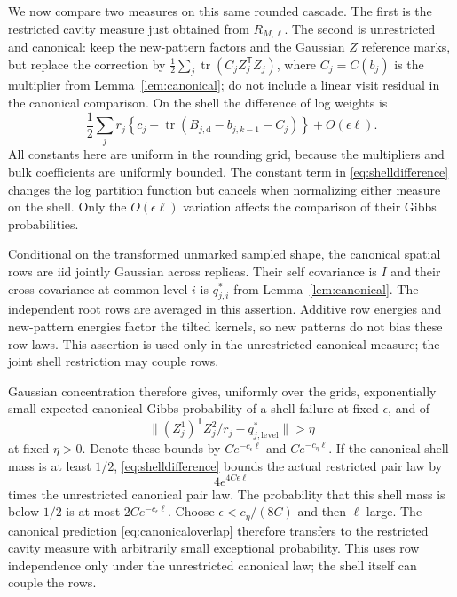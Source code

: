 \documentclass[11pt]{article}
\numberwithin{equation}{section}
\theoremstyle{definition}
\newcommand{\tr}{\operatorname{tr}}
\newcommand{\norm}[1]{\lVert #1\rVert}
\begin{document}
We now compare two measures on this same rounded cascade. The first is the restricted cavity measure just obtained from $R_{M,\ell}$. The second is unrestricted and canonical: keep the new-pattern factors and the Gaussian $Z$ reference marks, but replace the correction by
$\frac12\sum_j\tr(C_jZ_j^{\mathsf T}Z_j)$,
where $C_j=C(b_j)$ is the multiplier from Lemma~\ref{lem:canonical}; do not include a linear visit residual in the canonical comparison. On the shell the difference of log weights is
\begin{equation}\label{eq:shelldifference}
\frac12\sum_jr_j\left\{
 c_j+\tr(B_{j,\mathrm d}-b_{j,k-1}-C_j)\right\}+O(\epsilon\ell).
\end{equation}
All constants here are uniform in the rounding grid, because the multipliers and bulk coefficients are uniformly bounded. The constant term in \eqref{eq:shelldifference} changes the log partition function but cancels when normalizing either measure on the shell. Only the $O(\epsilon\ell)$ variation affects the comparison of their Gibbs probabilities.

Conditional on the transformed unmarked sampled shape, the canonical spatial rows are iid jointly Gaussian across replicas. Their self covariance is $I$ and their cross covariance at common level $i$ is $q_{j,i}^*$ from Lemma~\ref{lem:canonical}. The independent root rows are averaged in this assertion. Additive row energies and new-pattern energies factor the tilted kernels, so new patterns do not bias these row laws. This assertion is used only in the unrestricted canonical measure; the joint shell restriction may couple rows.

Gaussian concentration therefore gives, uniformly over the grids, exponentially small expected canonical Gibbs probability of a shell failure at fixed $\epsilon$, and of
\begin{equation}\label{eq:canonicaloverlap}
\norm{(Z_j^1)^{\mathsf T}Z_j^2/r_j-q^*_{j,\mathrm{level}}}>\eta
\end{equation}
at fixed $\eta>0$. Denote these bounds by $Ce^{-c_\epsilon\ell}$ and $Ce^{-c_\eta\ell}$. If the canonical shell mass is at least $1/2$, \eqref{eq:shelldifference} bounds the actual restricted pair law by
\begin{equation}\label{eq:paircomparison}
4e^{4C\epsilon\ell}
\end{equation}
times the unrestricted canonical pair law. The probability that this shell mass is below $1/2$ is at most $2Ce^{-c_\epsilon\ell}$. Choose $\epsilon<c_\eta/(8C)$ and then $\ell$ large. The canonical prediction \eqref{eq:canonicaloverlap} therefore transfers to the restricted cavity measure with arbitrarily small exceptional probability. This uses row independence only under the unrestricted canonical law; the shell itself can couple the rows.
\end{document}
